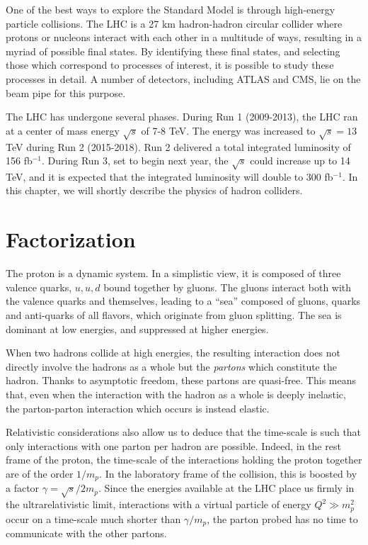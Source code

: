 \documentclass[10pt,a4paper]{book}
\begin{document}
One of the best ways to explore the Standard Model is through high-energy particle collisions. The LHC is a 27 km hadron-hadron circular collider where protons or nucleons interact with each other in a multitude of ways, resulting in a myriad of possible final states. By identifying these final states, and selecting those which correspond to processes of interest, it is possible to study these processes in detail. A number of detectors, including ATLAS and CMS, lie on the beam pipe for this purpose.

The LHC has undergone several phases. During Run 1 (2009-2013), the LHC ran at a center of mass energy $\sqrt{s}$ of 7-8 TeV. The energy was increased to $\sqrt{s} = 13$ TeV during Run 2 (2015-2018). 
Run 2 delivered a total integrated luminosity of 156 fb$^{-1}$. During Run 3, set to begin next year, the $\sqrt{s}$ could increase up to 14 TeV, and it is expected that the integrated luminosity will double to 300 fb$^{-1}$. In this chapter, we will shortly describe the physics of hadron colliders.

\section{Factorization}

  
The proton is a dynamic system. In a simplistic view, it is composed of three valence quarks, $u, u, d$ bound together by gluons. The gluons interact both with the valence quarks and themselves, leading to a ``sea'' composed of gluons, quarks and anti-quarks of all flavors, which originate from gluon splitting. The sea is dominant at low energies, and suppressed at higher energies. 

When two hadrons collide at high energies, the resulting interaction does not directly involve the hadrons as a whole but the \emph{partons} which constitute the hadron. Thanks to asymptotic freedom, these partons are quasi-free. This means that, even when the interaction with the hadron as a whole is deeply inelastic, the parton-parton interaction which occurs is instead elastic. 

Relativistic considerations also allow us to deduce that the time-scale is such that only interactions with one parton per hadron are possible. Indeed, in the rest frame of the proton, the time-scale of the interactions holding the proton together are of the order $1/m_p$. In the laboratory frame of the collision, this is boosted by a factor $\gamma = \sqrt{s}/2m_p$. Since the energies available at the LHC place us firmly in the ultrarelativistic limit, interactions with a virtual particle of energy $Q^2 \gg m_p^2$ occur on a time-scale much shorter than $\gamma/m_p$, the parton probed has no time to communicate with the other partons.
\end{document}
